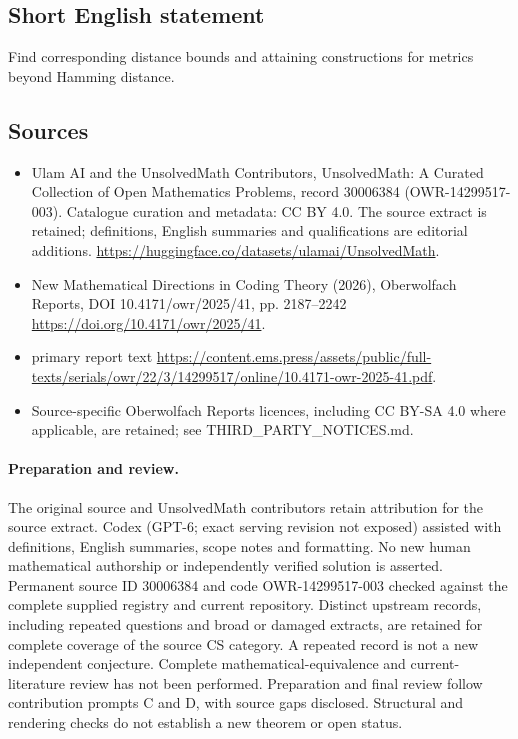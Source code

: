\documentclass[11pt]{article}
\begin{document}
\subsection{Short English statement}
Find corresponding distance bounds and attaining constructions for metrics beyond Hamming distance.
\subsection{Sources}
\begin{itemize}
\item[\hypertarget{source:30006384:1}{S1}] Ulam AI and the UnsolvedMath Contributors, UnsolvedMath: A Curated Collection of Open Mathematics Problems, record 30006384 (OWR-14299517-003). Catalogue curation and metadata: CC BY 4.0. The source extract is retained; definitions, English summaries and qualifications are editorial additions.
\url{https://huggingface.co/datasets/ulamai/UnsolvedMath}.
\item[\hypertarget{source:30006384:2}{S2}] New Mathematical Directions in Coding Theory (2026), Oberwolfach Reports, DOI 10.4171/owr/2025/41, pp. 2187--2242
\url{https://doi.org/10.4171/owr/2025/41}.
\item[\hypertarget{source:30006384:3}{S3}] primary report text
\url{https://content.ems.press/assets/public/full-texts/serials/owr/22/3/14299517/online/10.4171-owr-2025-41.pdf}.
\item Source-specific Oberwolfach Reports licences, including CC BY-SA 4.0 where applicable, are retained; see THIRD\_PARTY\_NOTICES.md.
\end{itemize}
\paragraph{Preparation and review.}
The original source and UnsolvedMath contributors retain attribution for the source extract. Codex (GPT-6; exact serving revision not exposed) assisted with definitions, English summaries, scope notes and formatting. No new human mathematical authorship or independently verified solution is asserted. Permanent source ID 30006384 and code OWR-14299517-003 checked against the complete supplied registry and current repository. Distinct upstream records, including repeated questions and broad or damaged extracts, are retained for complete coverage of the source CS category. A repeated record is not a new independent conjecture. Complete mathematical-equivalence and current-literature review has not been performed. Preparation and final review follow contribution prompts C and D, with source gaps disclosed. Structural and rendering checks do not establish a new theorem or open status.
\label{end:30006384}
\end{document}
